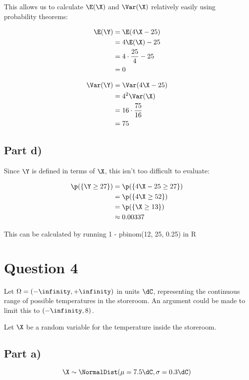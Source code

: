 This allows us to calculate $\E(\X)$ and $\Var(\X)$ relatively easily using probability theorems:

\begin{align*}
\E(\Y) &= \E(4\X - 25) \\
&= 4\E(\X) - 25 \\
&= 4 \cdot \frac{25}{4} - 25 \\
&= 0
\end{align*}

\begin{align*}
\Var(\Y) &= \Var(4\X - 25) \\
&= 4^2 \Var(\X) \\
&= 16 \cdot \frac{75}{16} \\
&= 75
\end{align*}

\subsection{Part d)}

Since $\Y$ is defined in terms of $\X$, this isn't too difficult to evaluate:

\begin{align*}
\p(\{ \Y \geq 27 \}) &= \p(\{ 4\X - 25 \geq 27 \}) \\
&= \p(\{ 4\X \geq 52\}) \\
&= \p(\{ \X \geq 13 \}) \\
&\approx 0.00337
\end{align*}

This can be calculated by running 1 - pbinom(12, 25, 0.25) in R

\newpage

\section{Question 4}

Let $\Omega = (-\infinity, +\infinity)$ in units $\dC$, representing the continuous range of possible temperatures in the storeroom.
An argument could be made to limit this to $(-\infinity, 8)$.

Let $\X$ be a random variable for the temperature inside the storeroom.

\subsection{Part a)}

\[
\X \sim \NormalDist (\mu = 7.5\dC, \sigma = 0.3\dC)
\]

